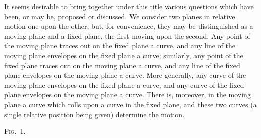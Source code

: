\documentclass[11pt]{article}
\begin{document}
\bigskip

It seems desirable to bring together under this title various questions which
have been, or may be, proposed or discussed. We consider two planes in relative
motion one upon the other, but, for convenience, they may be distinguished as a
moving plane and a fixed plane, the first moving upon the second. Any point of
the moving plane traces out on the fixed plane a curve, and any line of the moving
plane envelopes on the fixed plane a curve; similarly, any point of the fixed plane
traces out on the moving plane a curve, and any line of the fixed plane envelopes
on the moving plane a curve. More generally, any curve of the moving plane envelopes
on the fixed plane a curve, and any curve of the fixed plane envelopes on the
moving plane a curve. There is, moreover, in the moving plane a curve which rolls
upon a curve in the fixed plane, and these two curves (a single relative position
being given) determine the motion.

\begin{center}
\textsc{Fig.~1.}\\[-2pt]
\end{center}
\end{document}

